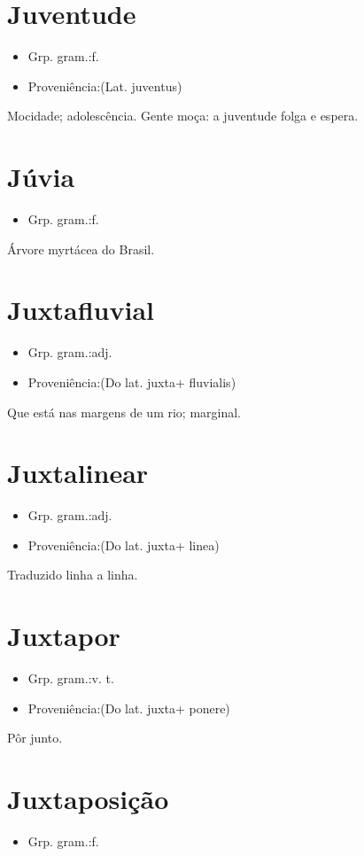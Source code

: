 \documentclass{article}
\begin{document}
\section{Juventude}
\begin{itemize}
\item {Grp. gram.:f.}
\end{itemize}
\begin{itemize}
\item {Proveniência:(Lat. \textunderscore juventus\textunderscore )}
\end{itemize}
Mocidade; adolescência.
Gente moça: \textunderscore a juventude folga e espera\textunderscore .
\section{Júvia}
\begin{itemize}
\item {Grp. gram.:f.}
\end{itemize}
Árvore myrtácea do Brasil.
\section{Juxtafluvial}
\begin{itemize}
\item {Grp. gram.:adj.}
\end{itemize}
\begin{itemize}
\item {Proveniência:(Do lat. \textunderscore juxta\textunderscore  + \textunderscore fluvialis\textunderscore )}
\end{itemize}
Que está nas margens de um rio; marginal.
\section{Juxtalinear}
\begin{itemize}
\item {Grp. gram.:adj.}
\end{itemize}
\begin{itemize}
\item {Proveniência:(Do lat. \textunderscore juxta\textunderscore  + \textunderscore linea\textunderscore )}
\end{itemize}
Traduzido linha a linha.
\section{Juxtapor}
\begin{itemize}
\item {Grp. gram.:v. t.}
\end{itemize}
\begin{itemize}
\item {Proveniência:(Do lat. \textunderscore juxta\textunderscore  + \textunderscore ponere\textunderscore )}
\end{itemize}
Pôr junto.
\section{Juxtaposição}
\begin{itemize}
\item {Grp. gram.:f.}
\end{itemize}
\end{document}
